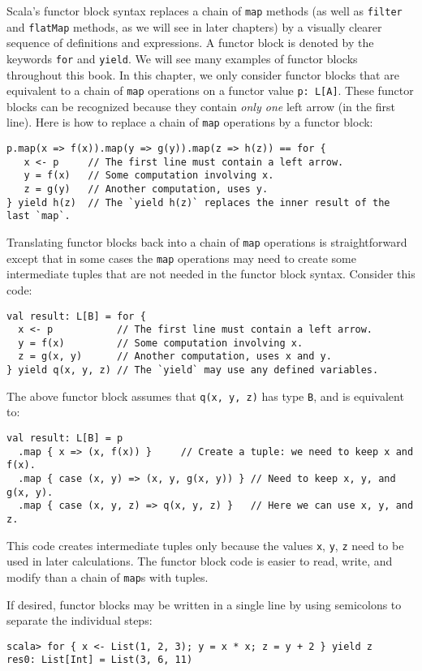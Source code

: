 Scala\textsf{'}s functor block syntax replaces a chain of \lstinline!map!
methods (as well as \lstinline!filter! and \lstinline!flatMap! methods,
as we will see in later chapters) by a visually clearer sequence of
definitions and expressions. A functor block is denoted by the keywords
\lstinline!for! and \lstinline!yield!. We will see many examples
of functor blocks throughout this book. In this chapter, we only consider
functor blocks that are equivalent to a chain of \lstinline!map!
operations on a functor value \lstinline!p: L[A]!. These functor
blocks can be recognized because they contain \emph{only one} left
arrow (in the first line). Here is how to replace a chain of \lstinline!map!
operations by a functor block:
\begin{lstlisting}
p.map(x => f(x)).map(y => g(y)).map(z => h(z)) == for {
   x <- p     // The first line must contain a left arrow.
   y = f(x)   // Some computation involving x.
   z = g(y)   // Another computation, uses y.
} yield h(z)  // The `yield h(z)` replaces the inner result of the last `map`.
\end{lstlisting}
Translating functor blocks back into a chain of \lstinline!map! operations
is straightforward except that in some cases the \lstinline!map!
operations may need to create some intermediate tuples that are not
needed in the functor block syntax. Consider this code:
\begin{lstlisting}
val result: L[B] = for {
  x <- p           // The first line must contain a left arrow.
  y = f(x)         // Some computation involving x.
  z = g(x, y)      // Another computation, uses x and y.
} yield q(x, y, z) // The `yield` may use any defined variables.
\end{lstlisting}
The above functor block assumes that \lstinline!q(x, y, z)! has type
\lstinline!B!, and is equivalent to:
\begin{lstlisting}
val result: L[B] = p
  .map { x => (x, f(x)) }     // Create a tuple: we need to keep x and f(x).
  .map { case (x, y) => (x, y, g(x, y)) } // Need to keep x, y, and g(x, y).
  .map { case (x, y, z) => q(x, y, z) }   // Here we can use x, y, and z.
\end{lstlisting}
This code creates intermediate tuples only because the values \lstinline!x!,
\lstinline!y!, \lstinline!z! need to be used in later calculations.
The functor block code is easier to read, write, and modify than a
chain of \lstinline!map!s with tuples. 

If desired, functor blocks may be written in a single line by using
semicolons to separate the individual steps:
\begin{lstlisting}
scala> for { x <- List(1, 2, 3); y = x * x; z = y + 2 } yield z
res0: List[Int] = List(3, 6, 11)
\end{lstlisting}

